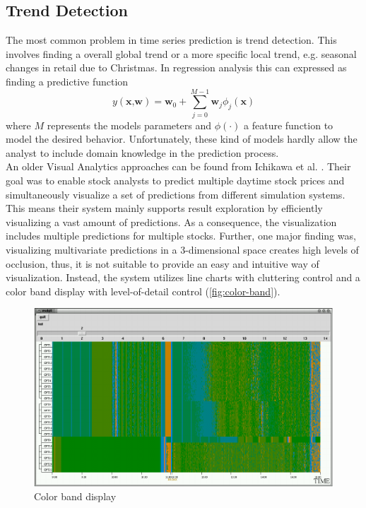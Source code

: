 \documentclass[electronic]{vgtc}             %
\begin{document}

\subsection{Trend Detection\label{subsec:trend}}
The most common problem in time series prediction is trend detection.
This involves finding a overall global trend or a more specific local trend, e.g. seasonal changes in retail due to Christmas.
In regression analysis this can expressed as finding a predictive function 
\[
y(\textbf{x,w}) = \textbf{w}_0 + \sum_{j=0}^{M-1} \textbf{w}_j \phi_j(\textbf{x})
\]
where $M$ represents the models parameters and $\phi(\cdot)$ a feature function to model the desired behavior. 
Unfortunately, these kind of models hardly allow the analyst to include domain knowledge in the prediction process.\\

An older Visual Analytics approaches can be found from Ichikawa et al. \cite{ichikawa:2002}.
Their goal was to enable stock analysts to predict multiple daytime stock prices and simultaneously visualize a set of predictions from different simulation systems. 
This means their system mainly supports result exploration by efficiently visualizing a vast amount of predictions.
As a consequence, the visualization includes multiple predictions for multiple stocks. 
Further, one major finding was, visualizing multivariate predictions in a 3-dimensional space creates high levels of occlusion, thus, it is not suitable to provide an easy and intuitive way of visualization.
Instead, the system utilizes line charts with cluttering control and a color band display with level-of-detail control (\autoref{fig:color-band}). 

\begin{figure}[htb]
	\centering
	\includegraphics[width=\columnwidth]{color-band}
	\caption{Color band display \cite{ichikawa:2002}}
	\label{fig:color-band}
\end{figure}
\end{document}
